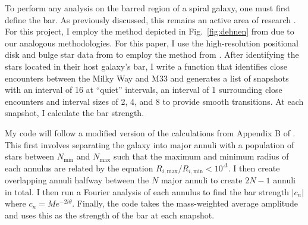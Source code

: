 \documentclass[twocolumn]{aastex631}
\DeclareRobustCommand{\Figref}[1]{Fig.~\ref{#1}}
\begin{document}
To perform any analysis on the barred region of a spiral galaxy, one
must first define the bar. As previously discussed, this remains an
active area of research \citep{berentzen:03}. For this project, I
employ the method depicted in \Figref{fig:dehnen} from
\citet{dehnen:23} due to our analogous methodologies. For this paper, I use
the high-resolution positional disk and bulge star data from
\citet{vandermarel:12} to employ the method from
\citet{dehnen:23}. After identifying the stars located in their host
galaxy's bar, I write a function that identifies close encounters
between the Milky Way and M33 and generates a list of snapshots with
an interval of 16 at ``quiet'' intervals, an interval of 1 surrounding
close encounters and interval sizes of 2, 4, and 8 to provide smooth
transitions. At each snapshot, I calculate the bar strength.

My code will follow a modified version of the calculations from
Appendix B of \citet{dehnen:23}. This first involves separating the
galaxy into major annuli with a population of stars between
$N_\text{min}$ and $N_\text{max}$ such that the maximum and minimum
radius of each annulus are related by the equation
$R_{i,\text{max}}/R_{i,\text{min}} < 10^\Delta$. I then create
overlapping annuli halfway between the $N$ major annuli to create
$2N-1$ annuli in total. I then run a Fourier analysis of each annulus
to find the bar strength $|c_n|$ where $c_n = Me^{-2i\theta}$.
Finally, the code takes the mass-weighted average amplitude and uses
this as the strength of the bar at each snapshot.
\end{document}
